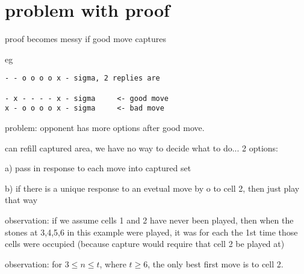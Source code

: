 \section*{problem with proof}
proof becomes messy if good move captures

eg

\begin{verbatim}
- - o o o o x - sigma, 2 replies are

- x - - - - x - sigma     <- good move
x - o o o o x - sigma     <- bad move
\end{verbatim}

problem: opponent has more options after good move.

can refill captured area, we have no way to decide
what to do... 2 options:

a) pass in response to each move
into captured set  

b) if there is a unique response to 
an evetual move by o to cell 2, then just play that way

observation:
if we assume cells 1 and 2 have never been played,
then when the stones at 3,4,5,6 in this example were played,
it was for each the 1st time those cells were occupied
(because capture would require that cell 2 be played at)

observation:
for $3 \leq n \leq t$, where $t\geq 6$, the only best first move is to cell 2.
